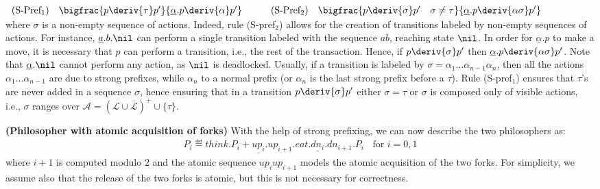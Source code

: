 $\begin{array}{lcllcllcl}
 \mbox{(S-Pref$_1$)}  &  \bigfrac{p\deriv{\tau}p'}{\underline{\alpha}.p\deriv{\alpha}p'} & \quad & 
 \mbox{(S-Pref$_2$)}  & \bigfrac{p\deriv{\sigma}p' \quad \sigma \neq \tau}{\underline{\alpha}.p\deriv{\alpha\sigma}p'} &  \\
\end{array}$\\

\noindent
where $\sigma$ is a non-empty sequence of actions. Indeed, rule (S-pref$_2$) allows for the creation of transitions labeled by non-empty sequences of actions. For instance, $\underline{a}.b.\nil$ can perform a single transition labeled with the sequence $ab$, reaching state $\nil$. In order for $\underline{\alpha}.p$ to make a move, it is necessary that $p$ can perform a transition, i.e., the rest of the transaction. Hence, if $p \deriv{\sigma} p'$ then $\underline{\alpha}.p \deriv{\alpha\sigma} p'$. Note that $\underline \alpha.\nil$ cannot perform any action, as $\nil$ is deadlocked. Usually, if a transition is labeled by $\sigma = \alpha_1 \ldots \alpha_{n-1} \alpha_n$, then all the actions $\alpha_1 \ldots \alpha_{n-1}$ are due to strong prefixes, while $\alpha_n$ to a normal prefix (or $\alpha_n$ is the last strong prefix before a $\tau$). Rule (S-pref$_1$) ensures that $\tau$'s are never added in a sequence $\sigma$, hence ensuring that in a transition $p \deriv{\sigma} p'$ either $\sigma = \tau$ or $\sigma$ is composed only of visible actions, i.e., $\sigma$ ranges over ${\mathcal A} = (\mathcal{L} \cup \overline{\mathcal L})^+ \cup \{\tau\}$.


\begin{example}\label{true-phil}{\bf (Philosopher with atomic acquisition of forks)}
With the help of strong prefixing, we can now describe the two philosophers as:
\begin{eqnarray*}
P_i \eqdef think.P_i + \underline{up_i}.up_{i+1}.eat.\underline{dn_i}.dn_{i+1}.P_i  \; \;  \mbox{   for  }i = 0, 1 
\end{eqnarray*}
where $i+1$ is computed modulo $2$ and  the atomic sequence $up_i up_{i+1}$ models the atomic  acquisition of the two forks. For simplicity, we assume also that the release of the two forks is atomic, but this is not necessary for correctness. 
\fine
\end{example}

